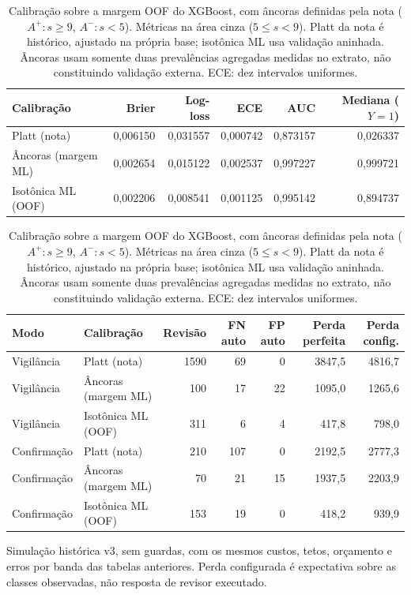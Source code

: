 \begin{table}[!ht]
\centering
\footnotesize
\caption{Calibração sobre a margem OOF do XGBoost, com âncoras definidas pela nota ($A^+:s\geq9$, $A^-:s<5$). Métricas na área cinza ($5\leq s<9$). Platt da nota é histórico, ajustado na própria base; isotônica ML usa validação aninhada. Âncoras usam somente duas prevalências agregadas medidas no extrato, não constituindo validação externa. ECE: dez intervalos uniformes.}
\label{tab:cap8-ancoras-ml}
\begin{tabular}{|l|r|r|r|r|r|}
\hline
Calibração & Brier & Log-loss & ECE & AUC & Mediana ($Y=1$) \\
\hline
Platt (nota) & 0,006150 & 0,031557 & 0,000742 & 0,873157 & 0,026337 \\
Âncoras (margem ML) & 0,002654 & 0,015122 & 0,002537 & 0,997227 & 0,999721 \\
Isotônica ML (OOF) & 0,002206 & 0,008541 & 0,001125 & 0,995142 & 0,894737 \\
\hline
\end{tabular}
\par\smallskip
\begin{tabular}{|l|l|r|r|r|r|r|}
\hline
Modo & Calibração & Revisão & FN auto & FP auto & Perda perfeita & Perda config. \\
\hline
Vigilância & Platt (nota) & 1590 & 69 & 0 & 3847,5 & 4816,7 \\
Vigilância & Âncoras (margem ML) & 100 & 17 & 22 & 1095,0 & 1265,6 \\
Vigilância & Isotônica ML (OOF) & 311 & 6 & 4 & 417,8 & 798,0 \\
Confirmação & Platt (nota) & 210 & 107 & 0 & 2192,5 & 2777,3 \\
Confirmação & Âncoras (margem ML) & 70 & 21 & 15 & 1937,5 & 2203,9 \\
Confirmação & Isotônica ML (OOF) & 153 & 19 & 0 & 418,2 & 939,9 \\
\hline
\end{tabular}
\par\smallskip
\parbox{\linewidth}{\footnotesize Simulação histórica v3, sem guardas, com os mesmos custos, tetos, orçamento e erros por banda das tabelas anteriores. Perda configurada é expectativa sobre as classes observadas, não resposta de revisor executado.}
\end{table}
